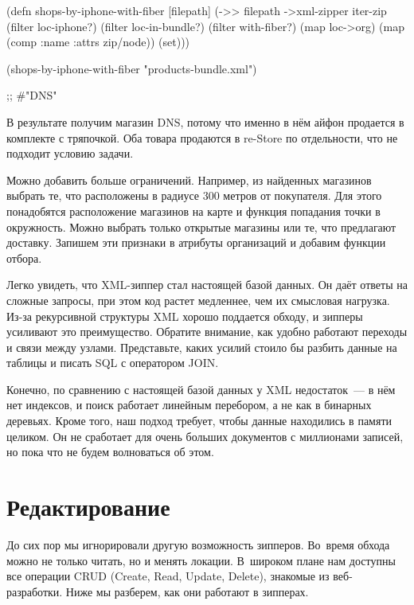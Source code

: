 \begin{english}
  \begin{clojure}
(defn shops-by-iphone-with-fiber [filepath]
  (->> filepath
       ->xml-zipper
       iter-zip
       (filter loc-iphone?)
       (filter loc-in-bundle?)
       (filter with-fiber?)
       (map loc->org)
       (map (comp :name :attrs zip/node))
       (set)))

(shops-by-iphone-with-fiber "products-bundle.xml")

;; #{"DNS"}
  \end{clojure}
\end{english}

В результате получим магазин DNS, потому что именно в нём айфон продается в
комплекте с тряпочкой. Оба товара продаются в re-Store по отдельности, что не
подходит условию задачи.

Можно добавить больше ограничений. Например, из найденных магазинов выбрать те,
что расположены в радиусе 300 метров от покупателя. Для этого понадобятся
расположение магазинов на карте и функция попадания точки в окружность. Можно
выбрать только открытые магазины или те, что предлагают доставку. Запишем эти
признаки в атрибуты организаций и добавим функции отбора.

Легко увидеть, что XML-зиппер стал настоящей базой данных. Он даёт ответы на
сложные запросы, при этом код растет медленнее, чем их смысловая нагрузка. Из-за
рекурсивной структуры XML хорошо поддается обходу, и зипперы усиливают это
преимущество. Обратите внимание, как удобно работают переходы и связи между
узлами. Представьте, каких усилий стоило бы разбить данные на таблицы и писать
SQL с оператором JOIN.

Конечно, по сравнению с настоящей базой данных у XML недостаток~--- в нём нет
индексов, и поиск работает линейным перебором, а не как в бинарных
деревьях. Кроме того, наш подход требует, чтобы данные находились в памяти
целиком. Он не сработает для очень больших документов с миллионами записей, но
пока что не будем волноваться об этом.

\section{Редактирование}

До сих пор мы игнорировали другую возможность зипперов. Во~время обхода можно не
только читать, но и менять локации. В~широком плане нам доступны все операции
CRUD (Create, Read, Update, Delete), знакомые из веб-разработки. Ниже мы
разберем, как они работают в зипперах.

